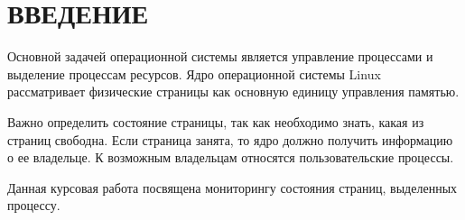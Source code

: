 \chapter*{ВВЕДЕНИЕ}

Основной задачей операционной системы является управление процессами и выделение процессам ресурсов. Ядро операционной системы Linux рассматривает физические страницы как основную единицу управления памятью.

Важно определить состояние страницы, так как необходимо знать, какая из страниц свободна. Если страница занята, то ядро должно получить информацию о ее владельце. К возможным владельцам относятся пользовательские процессы.

Данная курсовая работа посвящена мониторингу состояния страниц, выделенных процессу.
